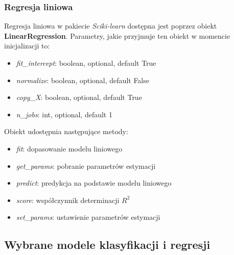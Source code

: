 \subsubsection{Regresja liniowa}
Regresja liniowa w pakiecie \textit{Sciki-learn} dostępna jest poprzez obiekt \textbf{LinearRegression}.
Parametry, jakie przyjmuje ten obiekt w momencie inicjalizacji to\cite{scikit_doc}:
\begin{itemize}
 \item \textit{fit\_intercept}: boolean, optional, default True
 \item \textit{normalize}: boolean, optional, default False
 \item \textit{copy\_X}: boolean, optional, default True
 \item \textit{n\_jobs}: int, optional, default 1
\end{itemize}

Obiekt udostępnia następujące metody:
\begin{itemize}
 \item \textit{fit}: dopasowanie modelu liniowego
 \item \textit{get\_params}: pobranie parametrów estymacji
 \item \textit{predict}: predykcja na podstawie modelu liniowego
 \item \textit{score}: współczynnik determinacji $R^2$
 \item \textit{set\_params}: ustawienie parametrów estymacji
\end{itemize}






\subsection{Wybrane modele klasyfikacji i regresji}
